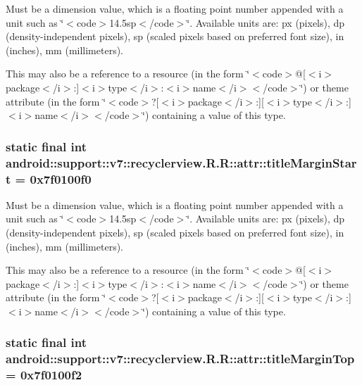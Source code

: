 Must be a dimension value, which is a floating point number appended with a unit such as \char`\"{}$<$code$>$14.5sp$<$/code$>$\char`\"{}. Available units are: px (pixels), dp (density-independent pixels), sp (scaled pixels based on preferred font size), in (inches), mm (millimeters). 

This may also be a reference to a resource (in the form \char`\"{}$<$code$>$@\mbox{[}$<$i$>$package$<$/i$>$:\mbox{]}$<$i$>$type$<$/i$>$:$<$i$>$name$<$/i$>$$<$/code$>$\char`\"{}) or theme attribute (in the form \char`\"{}$<$code$>$?\mbox{[}$<$i$>$package$<$/i$>$:\mbox{]}\mbox{[}$<$i$>$type$<$/i$>$:\mbox{]}$<$i$>$name$<$/i$>$$<$/code$>$\char`\"{}) containing a value of this type. \hypertarget{classandroid_1_1support_1_1v7_1_1recyclerview_1_1_r_1_1attr_c574dea5acc47a92fed730f0bfd58c0d}{
\subsubsection[{titleMarginStart}]{\setlength{\rightskip}{0pt plus 5cm}static final int android::support::v7::recyclerview.R.R::attr::titleMarginStart = 0x7f0100f0}}
\label{classandroid_1_1support_1_1v7_1_1recyclerview_1_1_r_1_1attr_c574dea5acc47a92fed730f0bfd58c0d}


Must be a dimension value, which is a floating point number appended with a unit such as \char`\"{}$<$code$>$14.5sp$<$/code$>$\char`\"{}. Available units are: px (pixels), dp (density-independent pixels), sp (scaled pixels based on preferred font size), in (inches), mm (millimeters). 

This may also be a reference to a resource (in the form \char`\"{}$<$code$>$@\mbox{[}$<$i$>$package$<$/i$>$:\mbox{]}$<$i$>$type$<$/i$>$:$<$i$>$name$<$/i$>$$<$/code$>$\char`\"{}) or theme attribute (in the form \char`\"{}$<$code$>$?\mbox{[}$<$i$>$package$<$/i$>$:\mbox{]}\mbox{[}$<$i$>$type$<$/i$>$:\mbox{]}$<$i$>$name$<$/i$>$$<$/code$>$\char`\"{}) containing a value of this type. \hypertarget{classandroid_1_1support_1_1v7_1_1recyclerview_1_1_r_1_1attr_fe746bb211b5637156bf6d7dbfcb32e5}{
\subsubsection[{titleMarginTop}]{\setlength{\rightskip}{0pt plus 5cm}static final int android::support::v7::recyclerview.R.R::attr::titleMarginTop = 0x7f0100f2}}
\label{classandroid_1_1support_1_1v7_1_1recyclerview_1_1_r_1_1attr_fe746bb211b5637156bf6d7dbfcb32e5}


